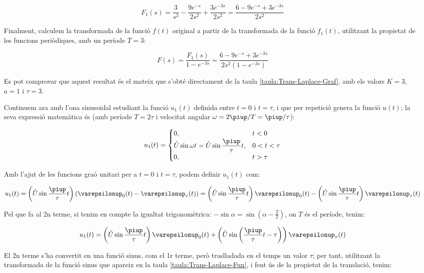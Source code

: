 \begin{exemple}[\CalcTransfLaplace{}]
    \[
        F_1(s) = \frac{3}{s^2} - \frac{9 e^{-s}}{2 s^2} + \frac{3 e^{-3s}}{2
        s^2} =\frac{6-9e^{-s}+3e^{-3s}}{2s^2}
    \]

    Finalment, calculem la transformada de la funció $f(t)$ original a
    partir de la transformada de la funció $f_1(t)$, utilitzant la
    propietat de les funcions periòdiques, amb un període $T=3$:

    \[
        F(s) = \frac{F_1(s)}{1-e^{-3s}} = \frac{6-9e^{-s}+3e^{-3s}}{2s^2(1-e^{-3s}) }
    \]

    Es pot comprovar que aquest resultat és el mateix que s'obté directament de la taula \vref{taula:Trans-Laplace-Graf}, amb els valors $K=3$, $a=1$ i $\tau=3$.

    Continuem ara  amb l'ona sinusoidal estudiant la funció $u_1(t)$
    definida entre $t=0$ i $t=\tau$, i que per repetició genera la
    funció $u(t)$; la seva expressió matemàtica és (amb període $T=
    2\tau$ i velocitat angular $\omega= 2\piup/T  = \piup/\tau$):

    \[
        u_1(t) = \begin{cases} 0, & t < 0\\ \hat{U}\sin\omega t =
        \hat{U}\sin\dfrac{\piup}{\tau}t,  & 0<t<\tau \\ 0, & t > \tau \end{cases}
    \]


    Amb l'ajut de les funcions graó unitari per a $t=0$ i $t=\tau$, podem
    definir $u_1(t)$ com:

    \[
        u_1(t)=\left(\hat{U}\sin\frac{\piup}{\tau}t\right)(\varepsilonup_0(t)-\varepsilonup_\tau(t))
        =\left(\hat{U}\sin\frac{\piup}{\tau}t\right)\varepsilonup_0(t) - \left(\hat{U}\sin\frac{\piup}{\tau}t\right)\varepsilonup_\tau(t)
    \]

    Pel que fa al 2n  terme, si tenim en compte la igualtat
    trigonomètrica: $-\sin \alpha = \sin(\alpha-\frac{T}{2})$, on $T$ és
    el període, tenim:

    \[
        u_1(t) = \left(\hat{U}\sin\frac{\piup}{\tau}t\right)\varepsilonup_0(t) +
        \left(\hat{U}\sin\left(\frac{\piup}{\tau}t-\tau\right)\right)\varepsilonup_\tau(t)
    \]

    El 2n terme s'ha convertit en una funció sinus, com el 1r terme,
    però traslladada en el temps un valor $\tau$; per tant, utilitzant la
    transformada de la funció sinus que apareix en la taula
    \vref{taula:Trans-Laplace-Fun}, i fent ús de la propietat de la
    translació, tenim:


\end{exemple}
